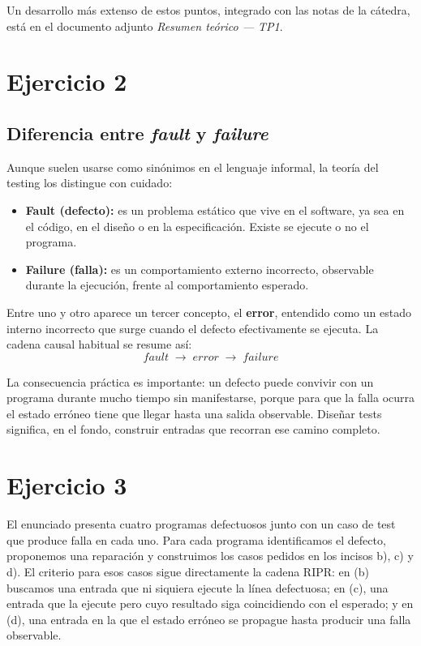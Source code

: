 \documentclass[12pt,a4paper]{article}
\begin{document}
Un desarrollo más extenso de estos puntos, integrado con las notas de la cátedra, está en el documento adjunto \textit{Resumen teórico --- TP1}.

\section{Ejercicio 2}
\subsection{Diferencia entre \textit{fault} y \textit{failure}}
Aunque suelen usarse como sinónimos en el lenguaje informal, la teoría del testing los distingue con cuidado:
\begin{itemize}
  \item \textbf{Fault (defecto):} es un problema estático que vive en el software, ya sea en el código, en el diseño o en la especificación. Existe se ejecute o no el programa.
  \item \textbf{Failure (falla):} es un comportamiento externo incorrecto, observable durante la ejecución, frente al comportamiento esperado.
\end{itemize}

Entre uno y otro aparece un tercer concepto, el \textbf{error}, entendido como un estado interno incorrecto que surge cuando el defecto efectivamente se ejecuta. La cadena causal habitual se resume así:
\[
\textit{fault} \;\rightarrow\; \textit{error} \;\rightarrow\; \textit{failure}
\]

La consecuencia práctica es importante: un defecto puede convivir con un programa durante mucho tiempo sin manifestarse, porque para que la falla ocurra el estado erróneo tiene que llegar hasta una salida observable. Diseñar tests significa, en el fondo, construir entradas que recorran ese camino completo.

\newpage
\section{Ejercicio 3}
El enunciado presenta cuatro programas defectuosos junto con un caso de test que produce falla en cada uno. Para cada programa identificamos el defecto, proponemos una reparación y construimos los casos pedidos en los incisos b), c) y d). El criterio para esos casos sigue directamente la cadena RIPR: en (b) buscamos una entrada que ni siquiera ejecute la línea defectuosa; en (c), una entrada que la ejecute pero cuyo resultado siga coincidiendo con el esperado; y en (d), una entrada en la que el estado erróneo se propague hasta producir una falla observable.
\end{document}
